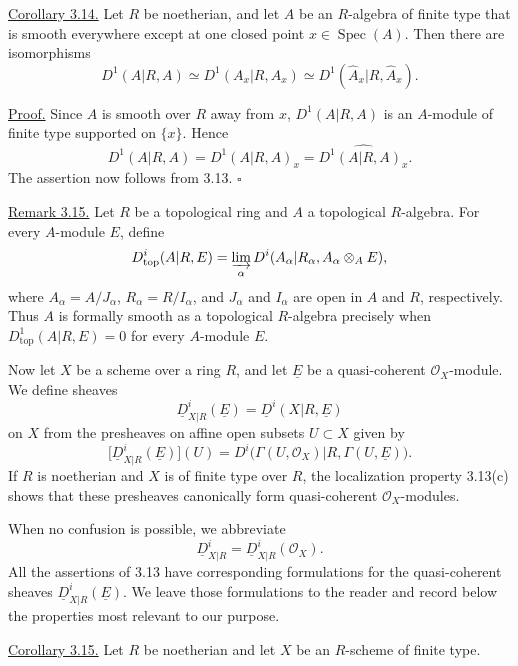 
\underline{Corollary 3.14.}
Let $R$ be noetherian, and let $A$ be an $R$-algebra of finite type
that is smooth everywhere except at one closed point
$x\in\operatorname{Spec}(A)$. Then there are isomorphisms
\[
 D^1(A|R,A)\simeq D^1(A_x|R,A_x)
 \simeq D^1(\widehat A_x|R,\widehat A_x).
\]

\underline{Proof.}
Since $A$ is smooth over $R$ away from $x$,
$D^1(A|R,A)$ is an $A$-module of finite type supported on
$\{x\}$. Hence
\[
 D^1(A|R,A)=D^1(A|R,A)_x
 =\widehat{D^1(A|R,A)_x}.
\]
The assertion now follows from 3.13.
\hfill$\square$

\underline{Remark 3.15.}
Let $R$ be a topological ring and $A$ a topological $R$-algebra.
For every $A$-module $E$, define
\[
 D^i_{\mathrm{top}}(A|R,E)
 =\varinjlim_\alpha
 D^i(A_\alpha|R_\alpha,A_\alpha\otimes_AE),
\]
where $A_\alpha=A/J_\alpha$, $R_\alpha=R/I_\alpha$, and
$J_\alpha$ and $I_\alpha$ are open in $A$ and $R$, respectively.
Thus $A$ is formally smooth as a topological $R$-algebra precisely
when $D^1_{\mathrm{top}}(A|R,E)=0$ for every $A$-module $E$.

Now let $X$ be a scheme over a ring $R$, and let $\underline E$ be a
quasi-coherent $\mathcal O_X$-module. We define sheaves
\[
 \underline D^i_{X|R}(\underline E)
 =\underline D^i(X|R,\underline E)
\]
on $X$ from the presheaves on affine open subsets $U\subset X$
given by
\[
 \bigl[\underline D^i_{X|R}(\underline E)\bigr](U)
 =D^i\bigl(\Gamma(U,\mathcal O_X)|R,
            \Gamma(U,\underline E)\bigr).
\]
If $R$ is noetherian and $X$ is of finite type over $R$, the
localization property 3.13(c) shows that these presheaves canonically
form quasi-coherent $\mathcal O_X$-modules.

When no confusion is possible, we abbreviate
\[
 \underline D^i_{X|R}
 =\underline D^i_{X|R}(\mathcal O_X).
\]
All the assertions of 3.13 have corresponding formulations for the
quasi-coherent sheaves $\underline D^i_{X|R}(\underline E)$. We leave
those formulations to the reader and record below the properties
most relevant to our purpose.

\underline{Corollary 3.15.}
Let $R$ be noetherian and let $X$ be an $R$-scheme of finite type.


